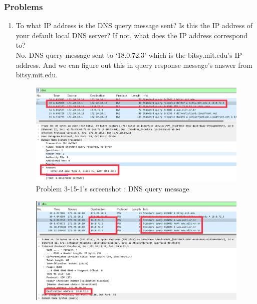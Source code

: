     \subsubsection*{Problems}
    \begin{enumerate}[label=\bfseries Problem \arabic*:,leftmargin=*,labelindent=1em]\addtocounter{enumi}{14}
        \item To what IP address is the DNS query message sent? 
        Is this the IP address of your default local DNS server? 
        If not, what does the IP address correspond to?\\[0.2mm]
            \soln No. DNS query message sent to ‘18.0.72.3’ which is the bitsy.mit.edu’s IP address. 
            And we can figure out this in query response message’s answer from bitsy.mit.edu.

            \begin{figure}[!h]\centering
                \hspace{10mm} 
        		\includegraphics[width=.79\textwidth]{image/result_week01/Q3-f-1.png}
        		\caption{\footnotesize Problem 3-15-1's screenshot : DNS query message}
        		\vspace{-10pt}
            \end{figure}
            \begin{figure}[!h]\centering
                \hspace{10mm} 
        		\includegraphics[width=.79\textwidth]{image/result_week01/Q3-f-2.png}

\end{figure}
\end{enumerate}
